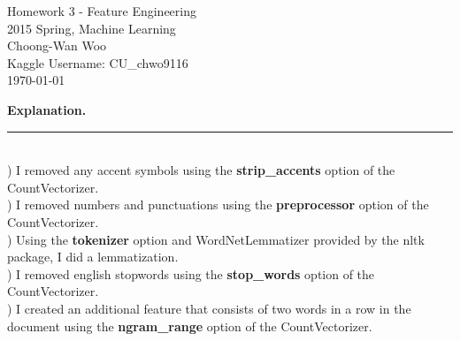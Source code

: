 \documentclass[letterpaper,11pt,notitlepage]{article}
\begin{document}
\begin{center}
	Homework 3 - Feature Engineering\\
	2015 Spring, Machine Learning\\
	Choong-Wan Woo\\
    Kaggle Username: CU\_chwo9116\\
	\today\\
\end{center}

\hspace*{-1cm}\textbf{Explanation.}  \rule{10.5cm}{0.4pt}\\

) I removed any accent symbols using the \textbf{strip\_accents} option of the CountVectorizer.\\  
) I removed numbers and punctuations using the \textbf{preprocessor} option of the CountVectorizer.\\
) Using the \textbf{tokenizer} option and WordNetLemmatizer provided by the nltk package, I did a lemmatization.\\
) I removed english stopwords using the \textbf{stop\_words} option of the CountVectorizer.\\
) I created an additional feature that consists of two words in a row in the document using the \textbf{ngram\_range} option of the CountVectorizer.\\
\end{document}
